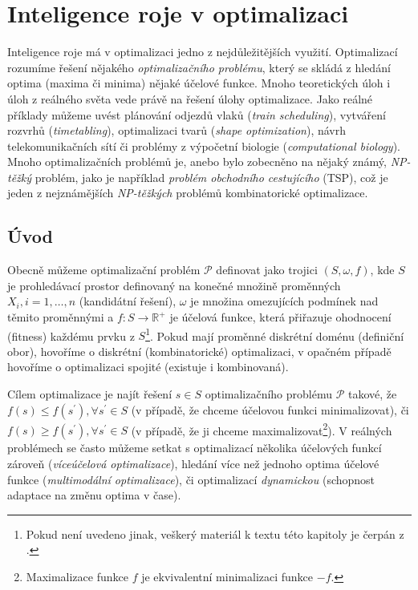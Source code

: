 \documentclass[a4paper,12pt]{article}
\begin{document}
\newpage



\section{Inteligence roje v optimalizaci}
Inteligence roje má v optimalizaci jedno z nejdůležitějších využití.
Optimalizací rozumíme řešení
nějakého {\it optimalizačního problému}, který se skládá z hledání optima (maxima či minima)
nějaké účelové funkce. Mnoho teoretických úloh i úloh z reálného světa vede právě na řešení úlohy
optimalizace. Jako reálné příklady můžeme uvést plánování odjezdů vlaků ({\it train scheduling}),
vytváření rozvrhů ({\it timetabling}), optimalizaci tvarů ({\it shape optimization}), návrh
telekomunikačních sítí či problémy z výpočetní biologie ({\it computational biology}). Mnoho
optimalizačních problémů je, anebo bylo zobecněno na nějaký známý, {\it NP-těžký} problém, jako je
například {\it problém obchodního cestujícího} (TSP), což je jeden z nejznámějších {\it NP-těžkých}
problémů kombinatorické optimalizace.

\subsection{Úvod}
Obecně můžeme optimalizační problém $\mathcal{P}$ definovat jako trojici $(S,\omega,f)$, kde $S$
je prohledávací prostor definovaný na konečné množině proměnných $X_i,i=1,\dots,n$ (kandidátní řešení),
 $\omega$ je množina omezujících podmínek nad těmito proměnnými a
$f:S\rightarrow\mathbb{R}^{+}$ je účelová funkce, která přiřazuje ohodnocení (fitness) každému prvku %
z $S$\footnote{Pokud není uvedeno jinak, veškerý materiál k textu této kapitoly je čerpán z \cite{Blum08SwarmOpt}.}.
Pokud mají proměnné diskrétní doménu (definiční obor), hovoříme o diskrétní
(kombinatorické) optimalizaci, v opačném případě hovoříme o optimalizaci spojité (existuje i
kombinovaná).

Cílem optimalizace je najít řešení $s\in S$ optimalizačního problému $\mathcal{P}$ takové, že
$f(s)\leq f(s^{\prime}),\forall s^{\prime}\in S$ (v případě, že chceme účelovou funkci
minimalizovat), či $f(s)\geq f(s^{\prime}),\forall s^{\prime}\in S$ (v případě, že ji chceme
maximalizovat\footnote{Maximalizace funkce $f$ je ekvivalentní minimalizaci funkce $-f$.}).
V reálných problémech se často můžeme setkat s optimalizací několika účelových
funkcí zároveň ({\it víceúčelová optimalizace}), hledání více než jednoho optima účelové funkce
({\it multimodální optimalizace}), či optimalizací {\it dynamickou} (schopnost adaptace na změnu
optima v čase). %
\end{document}
